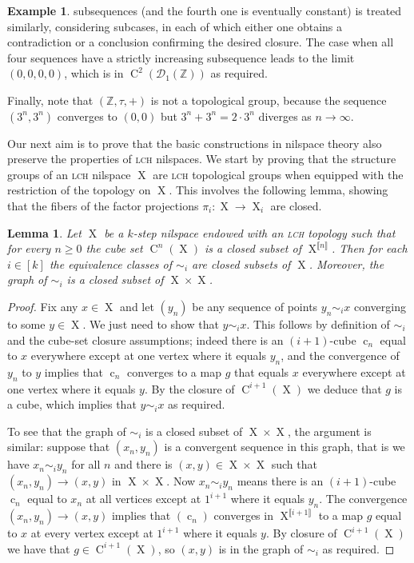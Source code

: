 \documentclass[a4paper,12pt,reqno]{amsart}
\newtheorem{lemma}[theorem]{Lemma}
\theoremstyle{definition}
\newtheorem{example}[theorem]{Example}
\def\to{\rightarrow}
\newcommand*{\db}[1]{\llbracket #1\rrbracket}
\newcommand{\mc}{\mathcal}
\newcommand{\mb}{\mathbb}
\DeclareMathOperator{\q}{c}
\DeclareMathOperator{\ns}{X}
\DeclareMathOperator{\cu}{C}
\begin{document}
\begin{example}
subsequences (and the fourth one is eventually constant) is treated similarly, considering subcases, in each of which either one obtains a contradiction or a conclusion confirming the desired closure. The case when all four sequences have a strictly increasing subsequence leads to the limit $(0,0,0,0)$, which is in $\cu^2(\mc{D}_1(\mb{Z}))$ as required.

Finally, note that $(\mb{Z},\tau,+)$ is not a topological group, because the sequence $(3^n,3^n)$ converges to $(0,0)$ but $3^n+3^n=2\cdot3^n$ diverges as $n\to\infty$.
\end{example}
\noindent Our next aim is to prove that the basic constructions in nilspace theory also preserve the properties of \textsc{lch} nilspaces. We start by proving that the structure groups of an \textsc{lch} nilspace $\ns$ are \textsc{lch} topological groups when equipped with the restriction of the topology on $\ns$. This involves the following lemma, showing that the fibers of the factor projections $\pi_i:\ns\to\ns_i$ are closed.
\begin{lemma}\label{lem:closure}
Let $\ns$ be a $k$-step nilspace endowed with an \textsc{lch} topology such that for every $n\ge 0$ the cube set $\cu^n(\ns)$ is a closed subset of $\ns^{\db{n}}$. Then for each $i\in [k]$ the equivalence classes of $\sim_i$ are closed subsets of $\ns$. Moreover, the graph of $\sim_i$ is a closed subset of $\ns\times \ns$.
\end{lemma}
\begin{proof}
Fix any $x\in \ns$ and let $(y_n)$ be any sequence of points $y_n\sim_i x$ converging to some $y\in \ns$. We just need to show that $y\sim_i x$. This follows by definition of $\sim_i$ and the cube-set closure assumptions; indeed there is an $(i+1)$-cube $\q_n$ equal to $x$ everywhere except at one vertex where it equals $y_n$, and the convergence of $y_n$ to $y$ implies that $\q_n$ converges to a map $g$ that equals $x$ everywhere except at one vertex where it equals $y$. By the closure of $\cu^{i+1}(\ns)$ we deduce that $g$ is a cube, which implies that $y\sim_i x$ as required.

To see that the graph of $\sim_i$ is a closed subset of $\ns\times \ns$, the argument is similar: suppose that $(x_n,y_n)$ is a convergent sequence in this graph, that is we have $x_n\sim_i y_n$ for all $n$ and there is $(x,y)\in \ns\times\ns$ such that $(x_n,y_n)\to (x,y)$ in $\ns\times \ns$. Now $x_n\sim_i y_n$ means there is an $(i+1)$-cube $\q_n$ equal to $x_n$ at all vertices except at $1^{i+1}$ where it equals $y_n$. The convergence $(x_n,y_n)\to (x,y)$ implies that $(\q_n)$ converges in $\ns^{\db{i+1}}$ to a map $g$ equal to $x$ at every vertex except at $1^{i+1}$ where it equals $y$. By closure of $\cu^{i+1}(\ns)$ we have that $g\in \cu^{i+1}(\ns)$, so $(x,y)$ is in the graph of $\sim_i$ as required.
\end{proof}
\end{document}
